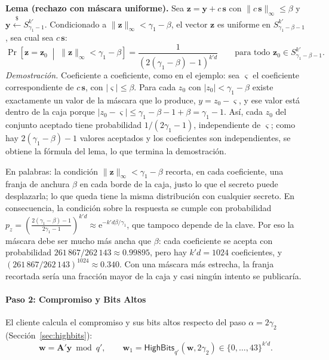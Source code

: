 \textbf{Lema (rechazo con máscara uniforme).} Sea $\mathbf{z} = \mathbf{y} + c\,\mathbf{s}$ con $\|c\,\mathbf{s}\|_\infty \le \beta$ y $\mathbf{y} \xleftarrow{\$} S_{\gamma_1-1}^{k'}$. Condicionado a $\|\mathbf{z}\|_\infty < \gamma_1 - \beta$, el vector $\mathbf{z}$ es uniforme en $S_{\gamma_1-\beta-1}^{k'}$, sea cual sea $c\,\mathbf{s}$:
\begin{equation}
\Pr\left[\mathbf{z} = \mathbf{z}_0 \;\middle|\; \|\mathbf{z}\|_\infty < \gamma_1 - \beta\right] = \frac{1}{(2(\gamma_1-\beta)-1)^{k'd}} \qquad \text{para todo } \mathbf{z}_0 \in S_{\gamma_1-\beta-1}^{k'}.
\end{equation}
\textit{Demostración.} Coeficiente a coeficiente, como en el ejemplo: sea $\varsigma$ el coeficiente correspondiente de $c\,\mathbf{s}$, con $|\varsigma| \le \beta$. Para cada $z_0$ con $|z_0| < \gamma_1 - \beta$ existe exactamente un valor de la máscara que lo produce, $y = z_0 - \varsigma$, y ese valor está dentro de la caja porque $|z_0 - \varsigma| \le \gamma_1 - \beta - 1 + \beta = \gamma_1 - 1$. Así, cada $z_0$ del conjunto aceptado tiene probabilidad $1/(2\gamma_1-1)$, independiente de $\varsigma$; como hay $2(\gamma_1-\beta)-1$ valores aceptados y los coeficientes son independientes, se obtiene la fórmula del lema, lo que termina la demostración.

En palabras: la condición $\|\mathbf{z}\|_\infty < \gamma_1 - \beta$ recorta, en cada coeficiente, una franja de anchura $\beta$ en cada borde de la caja, justo lo que el secreto puede desplazarla; lo que queda tiene la misma distribución con cualquier secreto. En consecuencia, la condición sobre la respuesta se cumple con probabilidad $p_z = \left(\frac{2(\gamma_1-\beta)-1}{2\gamma_1-1}\right)^{k'd} \approx \mathrm{e}^{-k'd\beta/\gamma_1}$, que tampoco depende de la clave. Por eso la máscara debe ser mucho más ancha que $\beta$: cada coeficiente se acepta con probabilidad $261\,867/262\,143 \approx 0.99895$, pero hay $k'd = 1024$ coeficientes, y $(261\,867/262\,143)^{1024} \approx 0.340$. Con una máscara más estrecha, la franja recortada sería una fracción mayor de la caja y casi ningún intento se publicaría.

\paragraph{Paso 2: Compromiso y Bits Altos}
El cliente calcula el compromiso y sus bits altos respecto del paso $\alpha = 2\gamma_2$ (Sección~\ref{sec:highbits}):
\begin{equation}
\mathbf{w} = \mathbf{A}'\mathbf{y} \bmod q', \qquad \mathbf{w}_1 = \mathsf{HighBits}_{q'}(\mathbf{w}, 2\gamma_2) \in \{0, \dots, 43\}^{k'd}.
\end{equation}

